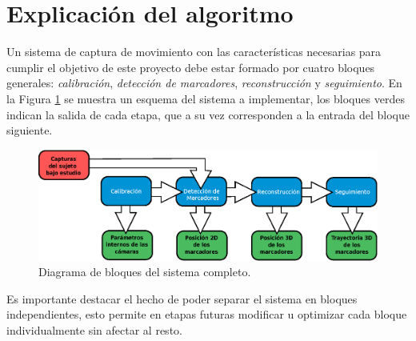 \section{Explicación del algoritmo}\label{implementacion}
Un sistema de captura de movimiento con las características necesarias para cumplir el objetivo de este proyecto debe estar formado por cuatro bloques generales: \emph{calibración}, \emph{detección de marcadores}, \emph{reconstrucción} y \emph{seguimiento}. En la Figura \ref{bloquesSist} se muestra un esquema del sistema a implementar, los bloques verdes indican la salida de cada etapa, que a su vez corresponden a la entrada del bloque siguiente.
\vspace{-0.6cm}
\begin{figure}[ht!]
\centering
\hspace{-0.5cm}
\includegraphics[scale=0.4]{imagenes/Sistema_completo/Diagrama_de_bloques.eps}
\caption{Diagrama de bloques del sistema completo.}
\label{bloquesSist}
\end{figure}
\vspace{-0.7cm}
Es importante destacar el hecho de poder separar el sistema en bloques independientes,
esto permite en etapas futuras modificar u optimizar cada bloque individualmente sin afectar al resto.
